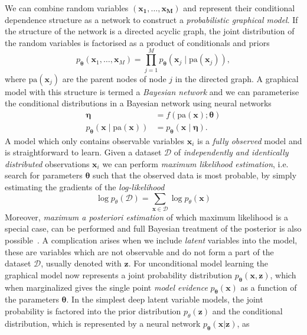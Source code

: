 \documentclass[final,3p,times,twocolumn]{elsarticle}
\begin{document}
We can combine random variables $(\mathbf{x_1}, \ldots, \mathbf{x_M})$ and represent their conditional dependence structure as a network to construct a \emph{probabilistic graphical model}. If the structure of the network is a directed acyclic graph, the joint distribution of the random variables is factorised as a product of conditionals and priors
\begin{equation}
	p_{\boldsymbol{\theta}}\left(\mathbf{x}_{1}, \ldots, \mathbf{x}_{M}\right)=\prod_{j=1}^{M} p_{\boldsymbol{\theta}}\left(\mathbf{x}_{j} \mid \mathrm{pa}(\mathbf{x}_{j})\right),
\end{equation}
where $ \mathrm{pa}(\mathbf{x}_{j})$ are the parent nodes of node $j$ in the directed graph. A graphical model with this structure is termed a \emph{Bayesian network} and we can parameterise the conditional distributions in a Bayesian network using neural networks
\begin{equation}
	\begin{aligned} 
		\boldsymbol{\eta} &=f(\mathrm{pa}(\mathbf{x}); \boldsymbol{\theta}) \\ p_{\boldsymbol{\theta}}(\mathbf{x} \mid \mathrm{pa}(\mathbf{x})) &=p_{\boldsymbol{\theta}}(\mathbf{x} \mid \boldsymbol{\eta}). 
	\end{aligned}
\end{equation}
A model which only contains observable variables $\mathbf{x}_i$ is a \emph{fully observed} model and is straightforward to learn. Given a dataset $\mathcal D$ of \emph{independently and identically distributed} observations $\mathbf{x}_i$ we can perform \emph{maximum likelihood estimation}, i.e. search for parameters $\boldsymbol{\theta}$ such that the observed data is most probable, by simply estimating the gradients of the \emph{log-likelihood}
\begin{equation}
	\log p_{\theta}(\mathcal{D})=\sum_{\mathbf{x} \in \mathcal{D}} \log p_{\theta}(\mathbf{x})
\end{equation}
Moreover, \emph{maximum a posteriori estimation} of which maximum likelihood is a special case, can be performed and full Bayesian treatment of the posterior is also possible~\cite{kingma2017variational}. 
A complication arises when we include \emph{latent} variables into the model, these are variables which are not observable and do not form a part of the dataset $\mathcal D$, usually denoted with $\mathbf{z}$. For unconditional model learning the graphical model now represents a joint probability distribution $p_{\boldsymbol{\theta}}(\mathbf{x}, \mathbf{z})$, which when marginalized gives the single point \emph{model evidence} $p_{\boldsymbol{\theta}}(\mathbf{x})$ as a function of the parameters $\boldsymbol{\theta}$. In the simplest deep latent variable models, the joint probability is factored into the prior distribution $p_{\theta}(\mathbf{z})$ and the conditional distribution, which is represented by a neural network $p_{\boldsymbol{\theta}}(\mathbf{x}|\mathbf{z})$,  as
\end{document}

